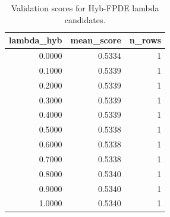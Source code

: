 \begin{table}[t]
\caption{Validation scores for Hyb-FPDE lambda candidates.}
\label{tab:lambda_distribution_computed}
\centering
\begin{tabular}{rrr}
\toprule
lambda\_hyb & mean\_score & n\_rows \\
\midrule
0.0000 & 0.5334 & 1 \\
0.1000 & 0.5339 & 1 \\
0.2000 & 0.5339 & 1 \\
0.3000 & 0.5339 & 1 \\
0.4000 & 0.5339 & 1 \\
0.5000 & 0.5338 & 1 \\
0.6000 & 0.5338 & 1 \\
0.7000 & 0.5338 & 1 \\
0.8000 & 0.5340 & 1 \\
0.9000 & 0.5340 & 1 \\
1.0000 & 0.5340 & 1 \\
\bottomrule
\end{tabular}

\end{table}
